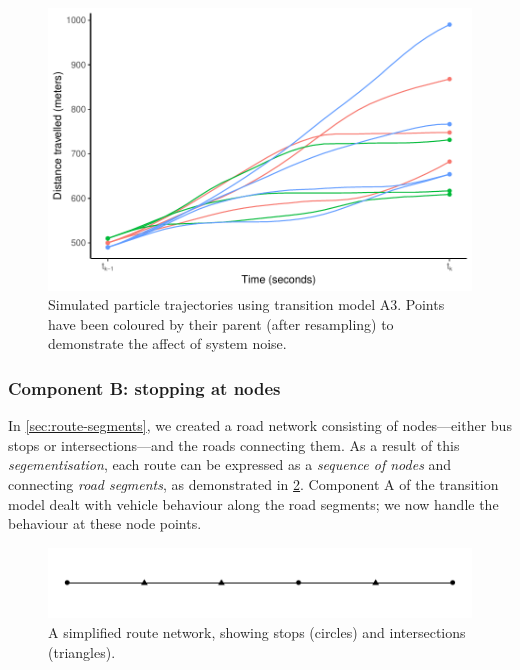 \begin{knitrout}
\color{fgcolor}\begin{figure}

{\centering \includegraphics[width=.8\textwidth]{figure/transition_a3_demo-1} 

}

\caption[Simulated particle trajectories using transition model A3]{Simulated particle trajectories using transition model A3. Points have been coloured by their parent (after resampling) to demonstrate the affect of system noise.}\label{fig:transition_a3_demo}
\end{figure}


\end{knitrout}


\subsubsection{Component B: stopping at nodes}
\label{sec:vehicle_model_nodes}

In \cref{sec:route-segments}, we created a road network consisting of nodes---either bus stops or intersections---and the roads connecting them. As a result of this \emph{segementisation}, each route can be expressed as a \emph{sequence of nodes} and connecting \emph{road segments}, as demonstrated in \cref{fig:route-nodes}. Component A of the transition model dealt with vehicle behaviour along the road segments; we now handle the behaviour at these node points.

\begin{knitrout}
\color{fgcolor}\begin{figure}

{\centering \includegraphics[width=.8\textwidth]{figure/route-nodes-1} 

}

\caption[A simplified route network, showing stops (circles) and intersections (triangles)]{A simplified route network, showing stops (circles) and intersections (triangles).}\label{fig:route-nodes}
\end{figure}


\end{knitrout}

